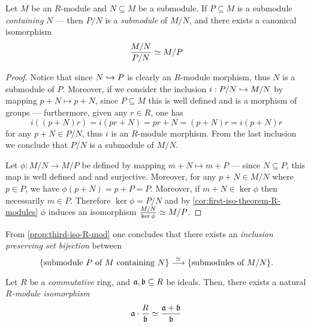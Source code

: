 \begin{proposition}
\label{prop:third-iso-R-mod}
Let \(M\) be an \(R\)-module and \(N \subseteq M\) be a submodule. If
\(P \subseteq M\) is a submodule \emph{containing} \(N\) --- then \(P/N\) is a
\emph{submodule} of \(M/N\), and there exists a canonical isomorphism
\[
\frac{M/N}{P/N} \simeq M/P
\]
\end{proposition}

\begin{proof}
Notice that since \(N \hookrightarrow P\) is clearly an \(R\)-module morphism, thus \(N\)
is a submodule of \(P\). Moreover, if we consider the inclusion
\(i: P/N \hookrightarrow M/N\) by mapping \(p + N \mapsto p + N\), since \(P \subseteq M\)
this is well defined and is a morphism of groups --- furthermore, given any
\(r \in R\), one has
\[
i((p + N) r) = i(p r + N) = p r + N = (p + N) r = i(p + N) r
\]
for any \(p + N \in P/N\), thus \(i\) is an \(R\)-module morphism. From the last
inclusion we conclude that \(P/N\) is a submodule of \(M/N\).

Let \(\phi: M/N \to M/P\) be defined by mapping \(m + N \mapsto m + P\) ---
since \(N \subseteq P\), this map is well defined and and surjective. Moreover,
for any \(p + N \in M/N\) where \(p \in P\), we have
\(\phi(p + N) = p + P = P\). Moreover, if \(m + N \in \ker \phi\) then
necessarily \(m \in P\). Therefore \(\ker \phi = P/N\) and by
\cref{cor:first-iso-theorem-R-modules} \(\phi\) induces an isomorphism
\(\frac{M/N}{\ker \phi} \simeq M/P\).
\end{proof}

From \cref{prop:third-iso-R-mod} one concludes that there exists an
\emph{inclusion preserving set bijection} between
\[
\{\text{submodule } P \text{ of } M \text{ containing } N\}
\overset{\simeq}\longrightarrow
\{\text{submodules of } M/N\}.
\]

\begin{proposition}
\label{prop:a*R/b-iso-a+b/b}
Let \(R\) be a \emph{commutative} ring, and \(\mathfrak{a}, \mathfrak{b} \subseteq R\)
be ideals. Then, there exists a natural \emph{\(R\)-module isomorphism}
\[
\mathfrak{a} \cdot \frac{R}{\mathfrak{b}}
\simeq \frac{\mathfrak{a} + \mathfrak{b}}{\mathfrak{b}}
\]
\end{proposition}

